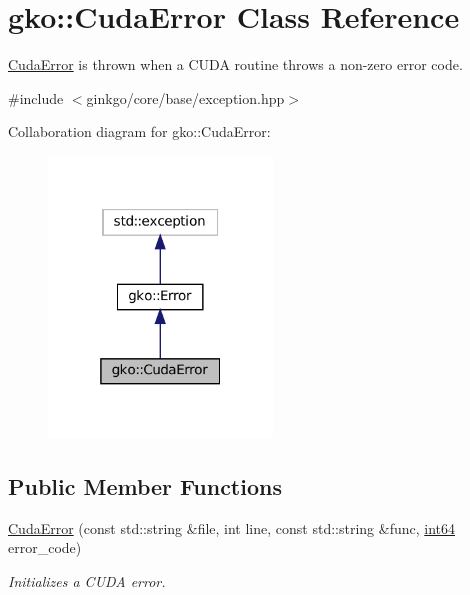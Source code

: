\hypertarget{classgko_1_1CudaError}{}\section{gko\+:\+:Cuda\+Error Class Reference}
\label{classgko_1_1CudaError}


\hyperlink{classgko_1_1CudaError}{Cuda\+Error} is thrown when a C\+U\+DA routine throws a non-\/zero error code.  




{\ttfamily \#include $<$ginkgo/core/base/exception.\+hpp$>$}



Collaboration diagram for gko\+:\+:Cuda\+Error\+:
\nopagebreak
\begin{figure}[H]
\begin{center}
\leavevmode
\includegraphics[width=169pt]{classgko_1_1CudaError__coll__graph}
\end{center}
\end{figure}
\subsection*{Public Member Functions}
\begin{DoxyCompactItemize}
\item 
\hyperlink{classgko_1_1CudaError_aa4f4d466d2ccdb9da5e331d8dad92d39}{Cuda\+Error} (const std\+::string \&file, int line, const std\+::string \&func, \hyperlink{namespacegko_a6c57dbf3168b1ecad3ea133aaf2efbc1}{int64} error\+\_\+code)
\begin{DoxyCompactList}\small\item\em Initializes a C\+U\+DA error. \end{DoxyCompactList}\end{DoxyCompactItemize}


